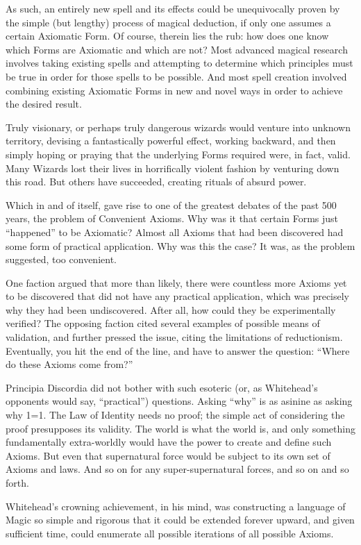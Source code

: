 As such, an entirely new spell and its effects could be unequivocally proven by the simple (but lengthy) process of magical deduction, if only one assumes a certain Axiomatic Form. Of course, therein lies the rub: how does one know which Forms are Axiomatic and which are not? Most advanced magical research involves taking existing spells and attempting to determine which principles must be true in order for those spells to be possible. And most spell creation involved combining existing Axiomatic Forms in new and novel ways in order to achieve the desired result.

Truly visionary, or perhaps truly dangerous wizards would venture into unknown territory, devising a fantastically powerful effect, working backward, and then simply hoping or praying that the underlying Forms required were, in fact, valid. Many Wizards lost their lives in horrifically violent fashion by venturing down this road. But others have succeeded, creating rituals of absurd power.

Which in and of itself, gave rise to one of the greatest debates of the past 500 years, the problem of Convenient Axioms. Why was it that certain Forms just “happened” to be Axiomatic? Almost all Axioms that had been discovered had some form of practical application. Why was this the case? It was, as the problem suggested, too convenient.

One faction argued that more than likely, there were countless more Axioms yet to be discovered that did not have any practical application, which was precisely why they had been undiscovered. After all, how could they be experimentally verified? The opposing faction cited several examples of possible means of validation, and further pressed the issue, citing the limitations of reductionism. Eventually, you hit the end of the line, and have to answer the question: “Where do these Axioms come from?”

Principia Discordia did not bother with such esoteric (or, as Whitehead’s opponents would say, “practical”) questions. Asking “why” is as asinine as asking why 1=1. The Law of Identity needs no proof; the simple act of considering the proof presupposes its validity. The world is what the world is, and only something fundamentally extra-worldly would have the power to create and define such Axioms. But even that supernatural force would be subject to its own set of Axioms and laws. And so on for any super-supernatural forces, and so on and so forth.

Whitehead’s crowning achievement, in his mind, was constructing a language of Magic so simple and rigorous that it could be extended forever upward, and given sufficient time, could enumerate all possible iterations of all possible Axioms.

